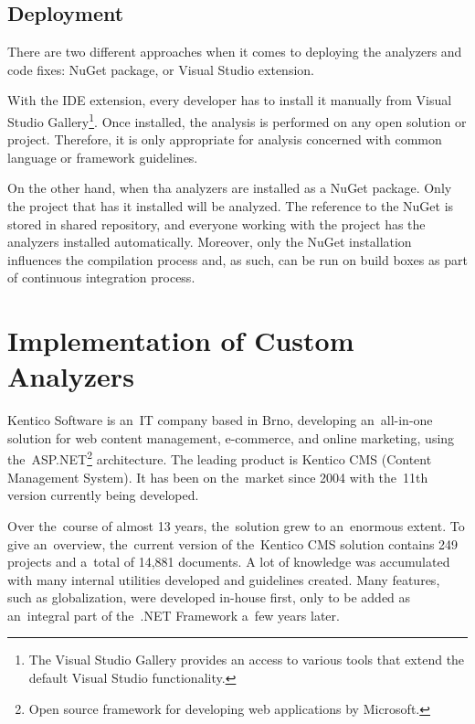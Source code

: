 \documentclass[
  digital, %
  table,   %
  lof,     %
  lot,     %
  oneside,
]{fithesis3}
\begin{document}
\section{Deployment}
There are two different approaches when it comes to deploying the analyzers and code fixes: NuGet package, or Visual Studio extension. 

With the IDE extension, every developer has to install it manually from Visual Studio Gallery\footnote{The Visual Studio Gallery provides an access to various tools that extend the default Visual Studio functionality.}. Once installed, the analysis is performed on any open solution or project. Therefore, it is only appropriate for analysis concerned with common language or framework guidelines.

On the other hand, when tha analyzers are installed as a NuGet package. Only the project that has it installed will be analyzed. The reference to the NuGet is stored in shared repository, and everyone working with the project has the analyzers installed automatically. Moreover, only the NuGet installation influences the compilation process and, as such, can be run on build boxes as part of continuous integration process.



\chapter{Implementation of Custom Analyzers}
\label{chap:custom-roslyn-analyzers}
Kentico Software is an~IT company based in Brno, developing an~all-in-one solution for web content management, e-commerce, and online marketing, using the~ASP.NET\footnote{Open source framework for developing web applications by Microsoft.} architecture. The leading product is Kentico CMS (Content Management System). It has been on the~market since 2004 with the~11th version currently being developed. 

Over the~course of almost 13 years, the~solution grew to an~enormous extent. To give an~overview, the~current version of the~Kentico CMS solution contains 249   projects and a~total of 14,881 documents. A lot of knowledge was accumulated with many internal utilities developed and guidelines created. Many features, such as globalization, were developed in-house first, only to be added as an~integral part of the~.NET Framework a~few years later.
\end{document}
